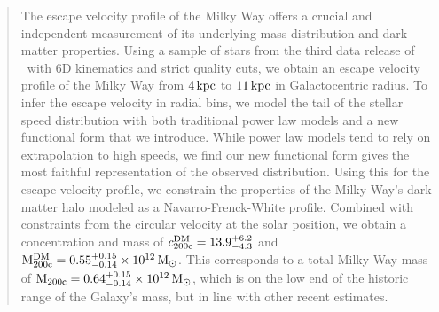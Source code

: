 \documentclass[twocolumn]{aastex631}
\begin{document}
\begin{abstract}
The escape velocity profile of the Milky Way offers a crucial and independent measurement 
of its underlying mass distribution and dark matter properties. 
Using a sample of stars from the third data release of \Gaia~with 6D kinematics and strict quality cuts, we obtain an escape velocity profile of the Milky Way from $4\,\rm{kpc}$ to $11\,\rm{kpc}$ in Galactocentric radius. To infer the escape velocity in radial bins, we model the tail of the stellar speed distribution with both traditional power law models and a new functional form that we introduce. 
While power law models tend to rely on extrapolation to high speeds, we find our new functional form gives the most faithful representation of the observed distribution. Using this for the escape velocity profile, we constrain the properties of the Milky Way's dark matter halo modeled as a Navarro-Frenck-White profile. Combined with constraints from the circular velocity at the solar position, we obtain a concentration and mass of $c_{200\rm{c}}^{\rm{DM}} = 13.9^{+6.2}_{-4.3}$ and $\rm{M}_{200\rm{c}}^{\rm{DM}} = 0.55^{+0.15}_{-0.14}\times 10^{12} \, M_\odot$. 
%
This corresponds to a total Milky Way mass of $\rm{M}_{200\rm{c}} = 0.64^{+0.15}_{-0.14}\times 10^{12} \, M_\odot$, which is on the low end of the historic range of the Galaxy's mass, but in line with other recent estimates. 
\end{abstract}





















{}



\end{document}
